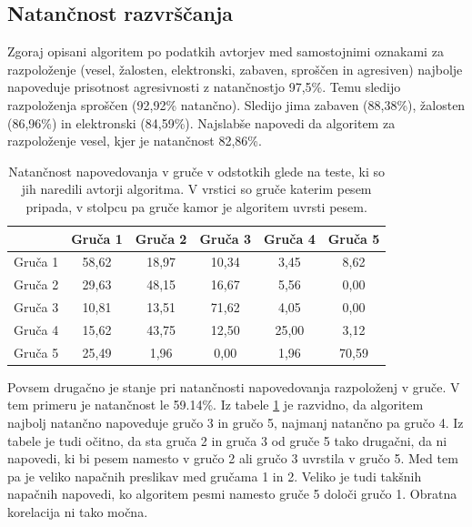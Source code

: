 \documentclass[a4paper, 12pt]{book}
\begin{document}
{\subsection{Natančnost razvrščanja}
\label{natancnostessentia}

Zgoraj opisani algoritem po podatkih avtorjev med samostojnimi oznakami za razpoloženje (vesel, žalosten, elektronski, zabaven, sproščen in agresiven) najbolje napoveduje prisotnost agresivnosti z natančnostjo 97,5\%. Temu sledijo razpoloženja sproščen (92,92\% natančno). Sledijo jima zabaven (88,38\%), žalosten (86,96\%) in elektronski (84,59\%). Najslabše napovedi da algoritem za razpoloženje vesel, kjer je natančnost 82,86\%.

\begin{table}[htb]
\begin{center}
\caption{Natančnost napovedovanja v gruče v odstotkih glede na teste, ki so jih naredili avtorji algoritma. V vrstici so gruče katerim pesem pripada, v stolpcu pa gruče kamor je algoritem uvrsti pesem.}
\begin{tabular}{|l|c|c|c|c|c|}
\hline
 & Gruča 1 & Gruča 2 & Gruča 3 & Gruča 4 & Gruča 5 \\ \hline
Gruča 1 & 58,62 & 18,97	& 10,34 & 3,45 & 8,62 \\ \hline
Gruča 2 & 29,63 & 48,15 & 16,67 & 5,56 & 0,00 \\ \hline
Gruča 3 & 10,81 & 13,51 & 71,62 & 4,05 & 0,00 \\ \hline
Gruča 4 & 15,62	& 43,75	& 12,50	& 25,00	& 3,12 \\ \hline
Gruča 5 & 25,49	& 1,96	& 0,00 & 1,96 & 70,59 \\ \hline

\hline
\end{tabular}
\label{natancnost_gruce}
\end{center}
\end{table}

Povsem drugačno je stanje pri natančnosti napovedovanja razpoloženj v gruče. V tem primeru je natančnost le  59.14\%. Iz tabele \ref{natancnost_gruce} je razvidno, da algoritem najbolj natančno napoveduje gručo 3 in gručo 5, najmanj natančno pa gručo 4. Iz tabele je tudi očitno, da sta gruča 2 in gruča 3 od gruče 5 tako drugačni, da ni napovedi, ki bi pesem namesto v gručo 2 ali gručo 3 uvrstila v gručo 5. Med tem pa je veliko napačnih preslikav med gručama 1 in 2. Veliko je tudi takšnih napačnih napovedi, ko algoritem pesmi namesto gruče 5 določi gručo 1. Obratna korelacija ni tako močna. 

}
\end{document}
